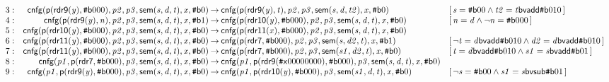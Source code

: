 \documentclass[a4paper]{article}
\newcommand{\ttsym}[1]{\mbox{\tt #1}}
\def\ttsharp{\ttsym{\symbol{35}}}
\newcommand{\symb}[1]{\mathsf{#1}}
\newcommand{\var}[1]{\mathit{#1}}
\newcommand{\Constraint}[1]{[\, #1 \,]}
\newcommand{\bv}[2][b]{{\ttsharp\symb{#1}{#2}}}
\begin{document}
\begin{landscape}
\[\begin{array}{rr@{\>}c@{\>}ll}
\mathrm{3} : 
 & \symb{cnfg}(\symb{p}(\symb{rdr9}(\var{y}),\bv{000}),\var{p2},\var{p3},\symb{sem}(\var{s},\var{d},\var{t}),\var{x},\bv{0})
 & \to 
 & \symb{cnfg}(\symb{p}(\symb{rdr9}(\var{y}),\var{t}),\var{p2},\var{p3},\symb{sem}(\var{s},\var{d},\var{t2}),\var{x},\bv{0})
 & \Constraint{\var{s} = \bv{00} \land \var{t2} = \var{t} \symb{bvadd} \bv{010}}\\

\mathrm{4} : 
 & \symb{cnfg}(\symb{p}(\symb{rdr9}(\var{y}),\var{n}),\var{p2},\var{p3},\symb{sem}(\var{s},\var{d},\var{t}),\var{x},\bv{1})
 & \to 
 & \symb{cnfg}(\symb{p}(\symb{rdr10}(\var{y}),\bv{000}),\var{p2},\var{p3},\symb{sem}(\var{s},\var{d},\var{t}),\var{x},\bv{0})
 & \Constraint{\var{n} = \var{d} \land \neg \var{n} = \bv{000}}\\

\mathrm{5} : 
 & \symb{cnfg}(\symb{p}(\symb{rdr10}(\var{y}),\bv{000}),\var{p2},\var{p3},\symb{sem}(\var{s},\var{d},\var{t}),\var{x},\bv{0})
 & \to 
 & \symb{cnfg}(\symb{p}(\symb{rdr11}(\var{x}),\bv{000}),\var{p2},\var{p3},\symb{sem}(\var{s},\var{d},\var{t}),\var{x},\bv{0})\\

\mathrm{6} : 
 & \symb{cnfg}(\symb{p}(\symb{rdr11}(\var{y}),\bv{000}),\var{p2},\var{p3},\symb{sem}(\var{s},\var{d},\var{t}),\var{x},\bv{0})
 & \to 
 & \symb{cnfg}(\symb{p}(\symb{rdr7},\bv{000}),\var{p2},\var{p3},\symb{sem}(\var{s},\var{d2},\var{t}),\var{x},\bv{1})
 & \Constraint{\neg \var{t} = \var{d} \symb{bvadd} \bv{010} \land \var{d2} = \var{d} \symb{bvadd} \bv{010}}\\

\mathrm{7} : 
 & \symb{cnfg}(\symb{p}(\symb{rdr11}(\var{y}),\bv{000}),\var{p2},\var{p3},\symb{sem}(\var{s},\var{d},\var{t}),\var{x},\bv{0})
 & \to 
 & \symb{cnfg}(\symb{p}(\symb{rdr7},\bv{000}),\var{p2},\var{p3},\symb{sem}(\var{s1},\var{d2},\var{t}),\var{x},\bv{0})
 & \Constraint{\var{t} = \var{d} \symb{bvadd} \bv{010} \land \var{s1} = \var{s} \symb{bvadd} \bv{01}}\\

\mathrm{8} : 
 & \symb{cnfg}(\var{p1},\symb{p}(\symb{rdr7},\bv{000}),\var{p3},\symb{sem}(\var{s},\var{d},\var{t}),\var{x},\bv{0})
 & \to 
 & \symb{cnfg}(\var{p1},\symb{p}(\symb{rdr9}(\bv[x]{00000000}),\bv{000}),\var{p3},\symb{sem}(\var{s},\var{d},\var{t}),\var{x},\bv{0})\\

\mathrm{9} : 
 & \symb{cnfg}(\var{p1},\symb{p}(\symb{rdr9}(\var{y}),\bv{000}),\var{p3},\symb{sem}(\var{s},\var{d},\var{t}),\var{x},\bv{0})
 & \to 
 & \symb{cnfg}(\var{p1},\symb{p}(\symb{rdr10}(\var{y}),\bv{000}),\var{p3},\symb{sem}(\var{s1},\var{d},\var{t}),\var{x},\bv{0})
 & \Constraint{\neg \var{s} = \bv{00} \land \var{s1} = \var{s} \symb{bvsub} \bv{01}}\\


\end{array}\]
\end{landscape}
\end{document}
